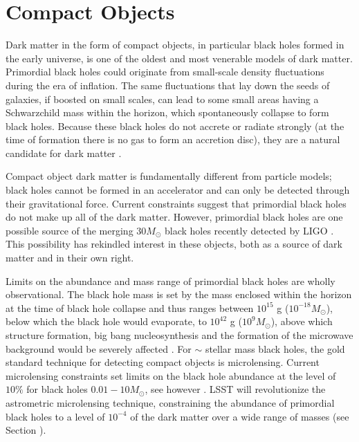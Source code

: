 \section{Compact Objects }
\label{sec:machos}


Dark matter in the form of compact objects, in particular black holes formed in the early universe, is one of the oldest and most venerable models of dark matter. Primordial black holes could originate from small-scale density fluctuations during the era of inflation. The same fluctuations that lay down the seeds of galaxies, if boosted on small scales, can lead to some small areas having a Schwarzchild mass within the horizon, which spontaneously collapse to form black holes. Because these black holes do not accrete or radiate strongly (at the time of formation there is no gas to form an accretion disc), they are a natural candidate for dark matter \citep{Carr:1974nx,Carr:2016drx}. 

Compact object dark matter is fundamentally different from particle models; black holes cannot be formed in an accelerator and can only be detected through their gravitational force. Current constraints suggest that primordial black holes do not make up all of the dark matter. However, primordial black holes are one possible source of the merging $30 M_\odot$ black holes recently detected by LIGO \citep{Bird:2016,Clesse:2016}. This possibility has rekindled interest in these objects, both as a source of dark matter and in their own right.

Limits on the abundance and mass range of primordial black holes are wholly observational. The black hole mass is set by the mass enclosed within the horizon at the time of black hole collapse and thus ranges between $10^{15}$ g ($10^{-18} M_\odot$), below which the black hole would evaporate, to $10^{42}$ g  ($10^9 M_\odot$), above which structure formation, big bang nucleosynthesis and the formation of the microwave background would be severely affected \citep{Sasaki:2018}. 
For $\sim $ stellar mass black holes, the gold standard technique for detecting compact objects is microlensing. Current microlensing constraints set limits on the black hole abundance at the level of $10\%$ for black holes $0.01 - 10 M_\odot$, see however \citep{Calcino:2018}. LSST will revolutionize the astrometric microlensing technique,  constraining the abundance of primordial black holes to a level of $10^{-4}$ of the dark matter over a wide range of masses (see Section ).

